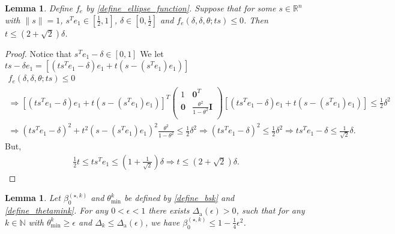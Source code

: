 \documentclass{article}
\newtheorem{lemma}[theorem]{Lemma}
\theoremstyle{case}
\numberwithin{theorem}{subsection}
\newcommand{\bsk}{{\beta_0^{(\star, k)}}}
\newcommand{\dacco}{{\Delta_{\textrm{a}}}}
\newcommand{\dk}{\Delta_k}
\newcommand{\fcki}{{\mathcal {F}^{(k)}_{\textrm{inner}}}}
\newcommand{\naturals}{\mathbb N}
\newcommand{\Rn}{\mathbb R^n}
\newcommand{\thetamink}{{\theta^k_{\textrm{min}}}}
\begin{document}
\begin{lemma}
\label{ellipse_fits_part_2}
Define $f_e$ by \cref{define_ellipse_function}.
Suppose that for some $s \in \Rn$ with $\|s\| = 1$, $s^Te_1 \in \left[\frac 1 2, 1\right]$, $\delta \in [0, \frac 1 2]$ and $f_e(\delta, \delta, \theta; ts) \le 0$.
Then $t \le \left(2 + \sqrt{2}\right) \delta$.
\end{lemma}
\begin{proof}
Notice that $s^Te_1 - \delta \in \left[0, 1\right]$
We let $ts - \delta e_1= \left[\left(ts^Te_1 - \delta\right) e_1 + t\left(s - \left(s^Te_1\right) e_1\right)\right]$
\begin{align*}
f_e(\delta, \delta, \theta; ts) \le 0 \\
\Longrightarrow 
\left[\left(ts^Te_1 - \delta\right) e_1 + t\left(s - \left(s^Te_1\right) e_1\right)\right]^T\begin{pmatrix}
1 & \boldsymbol0^T \\
\boldsymbol 0 & \frac{\theta^2}{1 - \theta^2} \boldsymbol I \\
\end{pmatrix}\left[\left(ts^Te_1 - \delta\right) e_1 + t\left(s - \left(s^Te_1\right) e_1\right)\right] \le \frac 1 2 \delta^2 \\
\Longrightarrow
\left(ts^Te_1 - \delta\right)^2 + t^2\left(s - \left(s^Te_1\right) e_1\right)^2  \frac{\theta^2}{1 - \theta^2} \le \frac 1 2 \delta^2
\Longrightarrow 
\left(t s^Te_1 - \delta\right)^2 \le \frac 1 2 \delta^2 
\Longrightarrow t s^Te_1 - \delta \le \frac 1 {\sqrt{2}} \delta.
\end{align*}
But,
\begin{align*}
\frac 1 2 t \le t s^Te_1 \le \left(1 + \frac 1 {\sqrt{2}}\right) \delta
\Longrightarrow t \le \left(2 + \sqrt{2}\right) \delta.
\end{align*}
\end{proof}




\begin{lemma}
\label{boundbsk}
Let $\bsk$ and $\thetamink$ be defined by \cref{define_bsk} and \cref{define_thetamink}.
For any $0 < \epsilon < 1$ there exists $\dacco(\epsilon) > 0$, such that for any $k \in \naturals$ with
$\thetamink \ge \epsilon$ and $\dk \le \dacco(\epsilon)$, we have
$\bsk \le 1 - \frac 1 4 \epsilon^2$.
\end{lemma}
\end{document}
